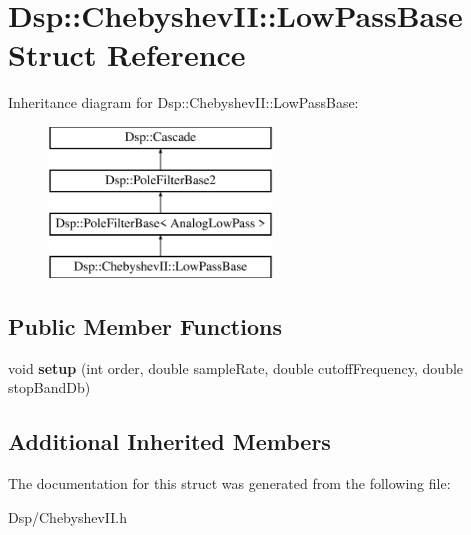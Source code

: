 \hypertarget{structDsp_1_1ChebyshevII_1_1LowPassBase}{\section{Dsp\-:\-:Chebyshev\-I\-I\-:\-:Low\-Pass\-Base Struct Reference}
\label{structDsp_1_1ChebyshevII_1_1LowPassBase}
}
Inheritance diagram for Dsp\-:\-:Chebyshev\-I\-I\-:\-:Low\-Pass\-Base\-:\begin{figure}[H]
\begin{center}
\leavevmode
\includegraphics[height=4.000000cm]{structDsp_1_1ChebyshevII_1_1LowPassBase}
\end{center}
\end{figure}
\subsection*{Public Member Functions}
\begin{DoxyCompactItemize}
\item 
\hypertarget{structDsp_1_1ChebyshevII_1_1LowPassBase_aa4fe48c70931caca182a5efcbfee0501}{void {\bfseries setup} (int order, double sample\-Rate, double cutoff\-Frequency, double stop\-Band\-Db)}\label{structDsp_1_1ChebyshevII_1_1LowPassBase_aa4fe48c70931caca182a5efcbfee0501}

\end{DoxyCompactItemize}
\subsection*{Additional Inherited Members}


The documentation for this struct was generated from the following file\-:\begin{DoxyCompactItemize}
\item 
Dsp/Chebyshev\-I\-I.\-h\end{DoxyCompactItemize}
